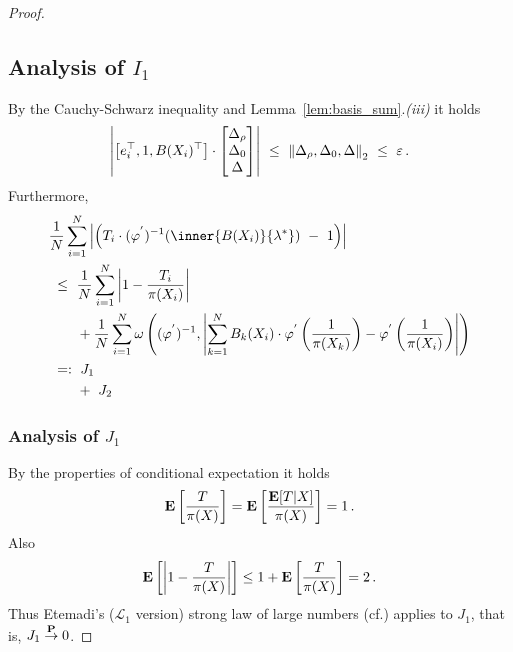 \begin{proof}
\subsection*{Analysis of $I_1$}
By the Cauchy-Schwarz inequality and Lemma~\ref{lem:basis_sum}.\textit{(iii)} it holds
\begin{align*}
  \left|
   \left[ 
    e_i^\top,1,B(X_i)^\top
  \right]
  \cdot
  \begin{bmatrix}
    \Delta_\rho\\\Delta_0\\\Delta
    \end{bmatrix}
  \right|
  \ 
  \le
  \ 
  \norm{
    \Delta_\rho,\Delta_0,\Delta
  }_2
  \ 
  \le
  \ 
  \varepsilon
  \,.
\end{align*}
Furthermore,
\begin{align*}
  &
    \frac{1}{N}
\sum_{i=1} 
  ^N
  \left|
   \left( 
     T_i\cdot
  (
  \varphi^{'}
  )
  ^{-1}
  \!
  \left( 
\inner
{B(X_i)}
{
\lambda^*
}
  \right)
  \ 
  -
  \ 
  1
  \right)
  \right|
  \\
  &
  \ 
  \le
  \ 
    \frac{1}{N}
\sum_{i=1} 
^{N}
\left|
  1-
  \frac
  {T_i}
  {\pi(X_i)}
\right|
\\
&
\qquad
+
    \frac{1}{N}
    \sum_{i=1}^{N} 
\omega
\left(
  (
  \varphi^{'}
  )
  ^{-1}
  ,
  \left|
    \sum_{k=1}^{N}
  B_k(X_i)
  \cdot
  \varphi^{'}
  \left(
    \frac
    {1}
    {\pi(X_k)}
  \right)
  -
  \varphi^{'}
  \left(
    \frac
    {1}
    {\pi(X_i)}
  \right)
  \right|
  \right)
  \\
  &
  \ 
  =:
  \ 
  J_1
  \\
  &
  \qquad
  +
  \ 
  J_2
\end{align*}
\subsubsection*{Analysis of $J_1$}
By the properties of conditional expectation it holds
\begin{gather*}
  \E
  \left[ 
    \frac{T}{\pi(X)}
  \right]
  =
  \E
  \left[ 
    \frac{\E[T|X]}{\pi(X)}
  \right]
  =1
  \,.
\end{gather*}
Also
\begin{gather}
  \E
  \left[ 
    \left| 
    1
    -
    \frac{T}{\pi(X)}
    \right|
  \right]
  \le
  1
  +
  \E
  \left[ 
    \frac{T}{\pi(X)}
  \right]
  =
  2
  \,.
\end{gather}
Thus Etemadi's ($\mathcal{L}_1$ version) strong law of large numbers (cf.\cite[Theorem~5.17]{Klenke2020}) applies
to $J_1$, that is,
$J_1\overset{\P}{\to}0$.

\end{proof}
